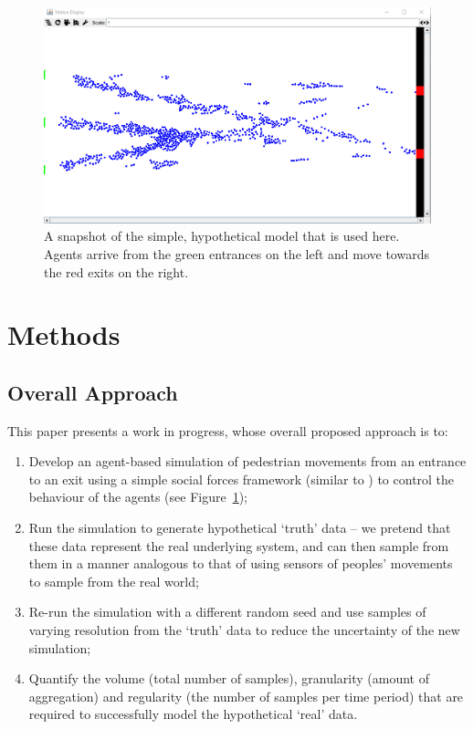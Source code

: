 \documentclass[runningheads]{llncs}
\begin{document}
\begin{figure}
\includegraphics[width=\textwidth]{figures/pedestrian_model_environment}
\caption{A snapshot of the simple, hypothetical model that is used here. Agents arrive from the green entrances on the left and move towards the red exits on the right.} \label{fig:pedestrian_model_environment}
\end{figure}

\section{Methods}

\subsection{Overall Approach}

This paper presents a work in progress, whose overall proposed approach is to:

\begin{enumerate}
\item Develop an  agent-based simulation of pedestrian movements from an entrance to an exit using a simple social forces framework (similar to \cite{helbing_social_1995}) to control the behaviour of the agents (see Figure~\ref{fig:pedestrian_model_environment});
\item Run the simulation to generate hypothetical `truth' data -- we pretend that these data represent the real underlying system, and can then sample from them in a manner analogous to that of using sensors of peoples' movements to sample from the real world;
\item \label{objectives:current} Re-run the simulation with a different random seed and use samples of varying resolution from the `truth' data to reduce the uncertainty of the new simulation;
\item \label{objectives:da} Quantify the volume (total number of samples), granularity (amount of aggregation) and regularity (the number of samples per time period) that are required to successfully model the hypothetical `real' data.
\end{enumerate}
\end{document}
